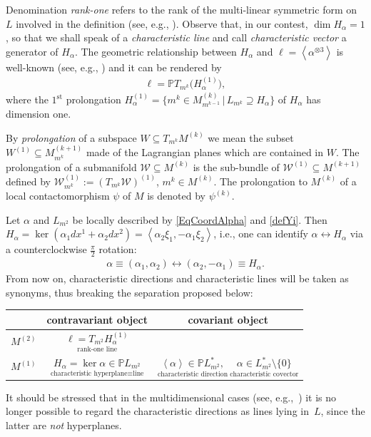 \documentclass[pdftex]{sigma}
\newcommand{\Span}[1]{\left\langle #1 \right\rangle}
\renewcommand{\P}{\mathbb{P}}
\newcommand{\St}{^\textrm{st}}
\numberwithin{equation}{section}
\begin{document}
Denomination \emph{rank-one} refers to the rank of the multi-linear symmetric form on $L$ involved in the def\/inition (see, e.g., \cite{MR2369200}).
Observe that, in our contest, $\dim H_\alpha=1$, so that we shall speak of a \emph{characteristic line} and call \emph{characteristic vector} a generator of $H_{\alpha}$. The geometric relationship between $H_\alpha$ and $\ell=\Span{\alpha^{\otimes 3}}$ is well-known (see, e.g., \cite{LucaChar}) and it can be rendered by
\begin{gather}\label{eqGeometriaDelRaggio}
\ell=\P T_{m^k}\big( H_\alpha^{(1)} \big),
\end{gather}
where the $1\St$ {prolongation} $ H_\alpha^{(1)}=\{ {m}^k\in M^{(k)}_{m^{k-1}}\,|\, L_{ {m}^k}\supseteq H_\alpha \}$ of $H_\alpha$ has dimension one.

By \emph{prolongation} of a subspace $W\subseteq T_{m^k}M^{(k)}$ we mean the subset $W^{(1)}\subseteq M^{(k+1)}_{m^k}$ made of the Lagrangian planes which are contained in $W$. The prolongation of a submanifold $\mathcal{W}\subseteq M^{(k)}$ is the sub-bundle of $\mathcal{W}^{(1)}\subseteq M^{(k+1)}$ def\/ined by $\mathcal{W}^{(1)}_{m^k}:=(T_{m^k}\mathcal{W})^{(1)}$, $m^k\in M^{(k)}$. The prolongation to $M^{(k)}$ of a local contactomorphism $\psi$ of $M$ is denoted by $\psi^{(k)}$.

\begin{Remark}\label{RemarcoFondamentale}
 Let $\alpha$ and $L_{m^2}$ be locally described by \eqref{EqCoordAlpha} and \eqref{defYi}. Then $ H_\alpha= \ker(\alpha_1dx^1+\alpha_2dx^2)=\Span{\alpha_2 \xi_1,-\alpha_1 \xi _2}$,
i.e., one can identify $\alpha\leftrightarrow H_\alpha$ via a counterclockwise $\frac{\pi}{2}$ rotation:
\begin{gather}\label{RotazioneDelCazzo}
\alpha\equiv (\alpha_1,\alpha_2)\leftrightarrow(\alpha_2,-\alpha_1)\equiv H_\alpha.
\end{gather}
From now on, characteristic directions and characteristic lines
 will be taken as synonyms, thus breaking the separation proposed below:
\begin{center}
\begin{tabular}{c|c|c}
&contravariant object& covariant object \\
\hline
$M^{(2)}$&$\underset{\textrm{rank-one line}}{\ell=T_{m^2} H_\alpha^{(1)}}$ & \\
\hline
$M^{(1)}$&$\underset{\textrm{characteristic hyperplane}\equiv\textrm{line}}{H_\alpha=\ker\alpha\in \P L_{m^2} }$ & $\underset{\textrm{characteristic direction}}{\Span{\alpha}\in\P L_{m^2}^\ast,}\ \underset{\textrm{characteristic covector}}{\alpha\in L_{m^2}^\ast{\setminus}\{0\}}$
\end{tabular}
\end{center}

It should be stressed that in the multidimensional cases (see, e.g.,~\cite{MR2985508})
it is no longer possible to regard the characteristic directions as lines lying in~$L$, since the latter are \emph{not} hyperplanes.
\end{Remark}
\end{document}
